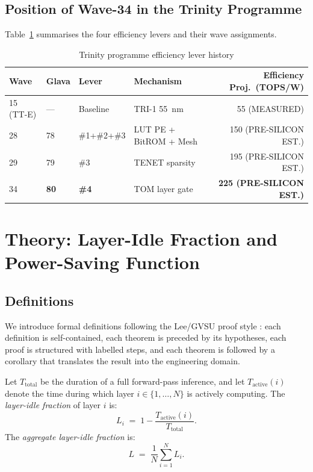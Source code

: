 \subsection{Position of Wave-34 in the Trinity Programme}

Table~\ref{tab:prior_work_position} summarises the four
efficiency levers and their wave assignments.

\begin{table}[ht]
\centering
\caption{Trinity programme efficiency lever history}
\label{tab:prior_work_position}
\begin{tabular}{llllr}
\hline
Wave & Glava & Lever & Mechanism & Efficiency Proj.\ (TOPS/W) \\
\hline
15 (TT-E) & --- & Baseline & TRI-1 55~nm & 55 (MEASURED) \\
28 & 78 & \#1+\#2+\#3 & LUT PE + BitROM + Mesh & 150 (PRE-SILICON EST.) \\
29 & 79 & \#3 & TENET sparsity & 195 (PRE-SILICON EST.) \\
34 & \textbf{80} & \textbf{\#4} & TOM layer gate & \textbf{225 (PRE-SILICON EST.)} \\
\hline
\end{tabular}
\end{table}

\section{Theory: Layer-Idle Fraction and Power-Saving Function}
\label{sec:theory}

\subsection{Definitions}

We introduce formal definitions following the Lee/GVSU proof style
\cite{lee_intro_topology}: each definition is self-contained, each theorem
is preceded by its hypotheses, each proof is structured with labelled steps,
and each theorem is followed by a corollary that translates the result into
the engineering domain.

\begin{definition}
\label{def:layer_idle}
Let \(T_{\mathrm{total}}\) be the duration of a full forward-pass inference,
and let \(T_{\mathrm{active}}(i)\) denote the time during which layer
\(i \in \{1,\ldots,N\}\) is actively computing.  The \emph{layer-idle
fraction} of layer \(i\) is:
\[
  L_{i} \;=\; 1 - \frac{T_{\mathrm{active}}(i)}{T_{\mathrm{total}}}.
\]
The \emph{aggregate layer-idle fraction} is:
\[
  L \;=\; \frac{1}{N}\sum_{i=1}^{N} L_{i}.
\]
\end{definition}

